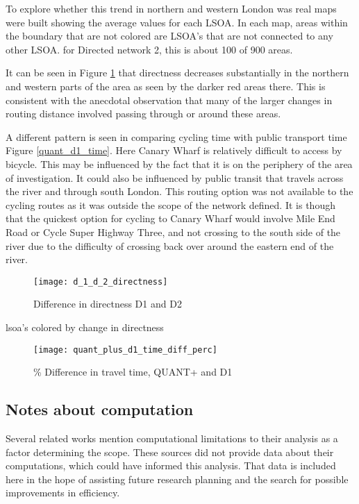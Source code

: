 To explore whether this trend in northern and western London was real maps were built showing the average values for each LSOA. In each map, areas within the boundary that are not colored are LSOA's that are not connected to any other LSOA. for Directed network 2, this is about 100 of 900 areas.  

It can be seen in Figure \ref{fig:d1_d2_directness} that directness decreases substantially in the northern and western parts of the area as seen by the darker red areas there. This is consistent with the anecdotal observation that many of the larger changes in routing distance involved passing through or around these areas. 

A different pattern is seen in comparing cycling time with public transport time Figure \ref{quant_d1_time}. Here Canary Wharf is relatively difficult to access by bicycle. This may be influenced by the fact that it is on the periphery of the area of investigation. It could also be influenced by public transit that travels across the river and through south London. This routing option was not available to the cycling routes as it was outside the scope of the network defined. It is though that the quickest option for cycling to Canary Wharf would involve Mile End Road or Cycle Super Highway Three, and not crossing to the south side of the river due to the difficulty of crossing back over around the eastern end of the river. 

\begin{figure}
\centering
\texttt{[image: d\_1\_d\_2\_directness]}
\caption{Difference in directness D1 and D2}
\label{fig:d1_d2_directness}
\end{figure}


lsoa's colored by change in directness 

\begin{figure}
\centering
\texttt{[image: quant\_plus\_d1\_time\_diff\_perc]}
\caption{\% Difference in travel time, QUANT+ and D1}
\label{fig:quant_d1_time}
\end{figure}

\subsection{Notes about computation}

Several related works mention computational limitations to their analysis as a factor determining the scope. These sources did not provide data about their computations, which could have informed this analysis. That data is included here in the hope of assisting future research planning and the search for possible improvements in efficiency. 

